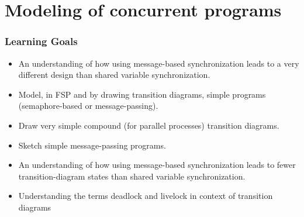 \part{Modeling of concurrent programs}
\section{Learning Goals}
\begin{itemize}
\item An understanding of how using message-based synchronization leads to a very different design than shared variable synchronization.
\item Model, in FSP and by drawing transition diagrams, simple programs (semaphore-based or message-passing).
\item Draw very simple compound (for parallel processes) transition diagrams.
\item  Sketch simple message-passing programs.
\item An understanding of how using message-based synchronization leads to fewer transition-diagram states than shared variable synchronization.
\item Understanding the terms deadlock and livelock in context of transition diagrams
\end{itemize}

